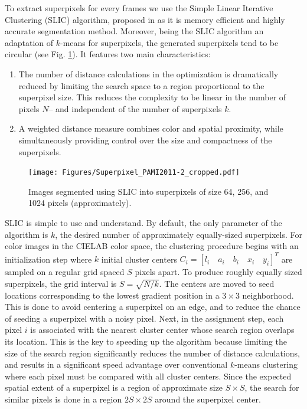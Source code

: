 To extract superpixels for every frames we use the Simple Linear Iterative Clustering (SLIC) algorithm, proposed in \cite{achanta12} as it is memory efficient and highly accurate segmentation method. Moreover, being the SLIC algorithm an adaptation of $k$-means for superpixels, the generated superpixels tend to be circular (see Fig. \ref{fig:SLIC}). It features two main characteristics:
\begin{enumerate}
\item The number of distance calculations in the optimization is dramatically reduced by limiting the search space to a
region proportional to the superpixel size. This reduces the complexity to be linear in the number of pixels $N$– and independent of the number of superpixels $k$.
\item A weighted distance measure combines color and spatial proximity, while simultaneously providing control over the size and compactness of the superpixels.
\end{enumerate}

\begin{figure}[htbp]
	\centering
		\texttt{[image: Figures/Superpixel\_PAMI2011-2\_cropped.pdf]}
	\caption{Images segmented using SLIC into superpixels of size 64, 256,
and 1024 pixels (approximately).}
	\label{fig:SLIC}
\end{figure}

SLIC is simple to use and understand. By default, the only parameter of the algorithm is $k$, the desired number of approximately equally-sized superpixels. For color images in the CIELAB color space, the clustering procedure begins with an initialization step where $k$ initial cluster centers $C_i = [l_i \quad a_i \quad b_i \quad x_i \quad y_i]^T$ are sampled on a regular grid spaced $S$ pixels apart. To produce roughly equally sized superpixels, the grid interval is $S =\sqrt{N/k}$. The centers are moved to seed locations corresponding to the lowest gradient position in a $3\times 3$ neighborhood. This is done to avoid centering a superpixel on an edge, and to reduce the chance of seeding a superpixel with a noisy pixel. Next, in the assignment step, each pixel $i$ is associated with the nearest cluster center whose search region overlaps its location. This is the key to speeding up the algorithm because limiting the size of the search region
significantly reduces the number of distance calculations, and results in a significant speed advantage over conventional $k$-means clustering where each pixel must be compared with all cluster centers. Since the expected spatial extent of a superpixel is a region of
approximate size $S\times S$, the search for similar pixels is done in a region $2S \times 2S$ around the superpixel center.

